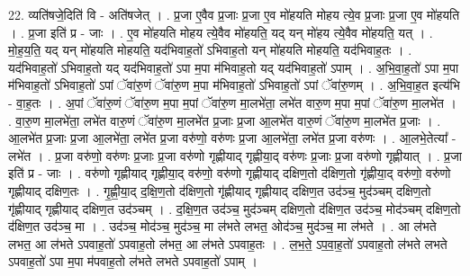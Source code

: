 \documentclass[17pt]{extarticle}
\begin{document}
22. व्यति॑षजे॒दिति॑ वि - अति॑षजेत् । . प्र॒जा ए॒वैव प्र॒जाः प्र॒जा ए॒व मो॑हयति मोहय त्ये॒व प्र॒जाः प्र॒जा ए॒व मो॑हयति । . प्र॒जा इति॑ प्र - जाः । . ए॒व मो॑हयति मोहय त्ये॒वैव मो॑हयति॒ यद् यन् मो॑हय त्ये॒वैव मो॑हयति॒ यत् । . मो॒ह॒य॒ति॒ यद् यन् मो॑हयति मोहयति॒ यद॑भिवाह॒तो॑ ऽभिवाह॒तो यन् मो॑हयति मोहयति॒ यद॑भिवाह॒तः । . यद॑भिवाह॒तो॑ ऽभिवाह॒तो यद् यद॑भिवाह॒तो॑ ऽपा म॒पा म॑भिवाह॒तो यद् यद॑भिवाह॒तो॑ ऽपाम् । . अ॒भि॒वा॒ह॒तो॑ ऽपा म॒पा म॑भिवाह॒तो॑ ऽभिवाह॒तो॑ ऽपां ॅवा॑रु॒णं ॅवा॑रु॒ण म॒पा म॑भिवाह॒तो॑ ऽभिवाह॒तो॑ ऽपां ॅवा॑रु॒णम् । . अ॒भि॒वा॒ह॒त इत्य॑भि - वा॒ह॒तः । . अ॒पां ॅवा॑रु॒णं ॅवा॑रु॒ण म॒पा म॒पां ॅवा॑रु॒ण मा॒लभे॑ता॒ लभे॑त वारु॒ण म॒पा म॒पां ॅवा॑रु॒ण मा॒लभे॑त । . वा॒रु॒ण मा॒लभे॑ता॒ लभे॑त वारु॒णं ॅवा॑रु॒ण मा॒लभे॑त प्र॒जाः प्र॒जा आ॒लभे॑त वारु॒णं ॅवा॑रु॒ण मा॒लभे॑त प्र॒जाः । . आ॒लभे॑त प्र॒जाः प्र॒जा आ॒लभे॑ता॒ लभे॑त प्र॒जा वरु॑णो॒ वरु॑णः प्र॒जा आ॒लभे॑ता॒ लभे॑त प्र॒जा वरु॑णः । . आ॒लभे॒तेत्या᳚ - लभे॑त । . प्र॒जा वरु॑णो॒ वरु॑णः प्र॒जाः प्र॒जा वरु॑णो गृह्णीयाद् गृह्णीया॒द् वरु॑णः प्र॒जाः प्र॒जा वरु॑णो गृह्णीयात् । . प्र॒जा इति॑ प्र - जाः । . वरु॑णो गृह्णीयाद् गृह्णीया॒द् वरु॑णो॒ वरु॑णो गृह्णीयाद् दक्षिण॒तो द॑क्षिण॒तो गृ॑ह्णीया॒द् वरु॑णो॒ वरु॑णो गृह्णीयाद् दक्षिण॒तः । . गृ॒ह्णी॒या॒द् द॒क्षि॒ण॒तो द॑क्षिण॒तो गृ॑ह्णीयाद् गृह्णीयाद् दक्षिण॒त उद॑ञ्च॒ मुद॑ञ्चम् दक्षिण॒तो गृ॑ह्णीयाद् गृह्णीयाद् दक्षिण॒त उद॑ञ्चम् । . द॒क्षि॒ण॒त उद॑ञ्च॒ मुद॑ञ्चम् दक्षिण॒तो द॑क्षिण॒त उद॑ञ्च॒ मोद॑ञ्चम् दक्षिण॒तो द॑क्षिण॒त उद॑ञ्च॒ मा । . उद॑ञ्च॒ मोद॑ञ्च॒ मुद॑ञ्च॒ मा ल॑भते लभत॒ ओद॑ञ्च॒ मुद॑ञ्च॒ मा ल॑भते । . आ ल॑भते लभत॒ आ ल॑भते ऽपवाह॒तो॑ ऽपवाह॒तो ल॑भत॒ आ ल॑भते ऽपवाह॒तः । . ल॒भ॒ते॒ ऽप॒वा॒ह॒तो॑ ऽपवाह॒तो ल॑भते लभते ऽपवाह॒तो॑ ऽपा म॒पा म॑पवाह॒तो ल॑भते लभते ऽपवाह॒तो॑ ऽपाम् । \newline
\end{document}
